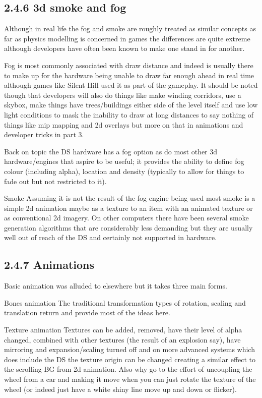 \documentclass[
]{book}
\begin{document}
\hypertarget{d-smoke-and-fog}{%
\subsection{2.4.6 3d smoke and fog}\label{d-smoke-and-fog}}

Although in real life the fog and smoke are roughly treated as similar concepts as far as physics modelling is concerned in games the differences are quite extreme although developers have often been known to make one stand in for another.

Fog is most commonly associated with draw distance and indeed is usually there to make up for the hardware being unable to draw far enough ahead in real time although games like Silent Hill used it as part of the gameplay. It should be noted though that developers will also do things like make winding corridors, use a skybox, make things have trees/buildings either side of the level itself and use low light conditions to mask the inability to draw at long distances to say nothing of things like mip mapping and 2d overlays but more on that in animations and developer tricks in part 3.

Back on topic the DS hardware has a fog option as do most other 3d hardware/engines that aspire to be useful; it provides the ability to define fog colour (including alpha), location and density (typically to allow for things to fade out but not restricted to it).

Smoke Assuming it is not the result of the fog engine being used most smoke is a simple 2d animation maybe as a texture to an item with an animated texture or as conventional 2d imagery. On other computers there have been several smoke generation algorithms that are considerably less demanding but they are usually well out of reach of the DS and certainly not supported in hardware.

\hypertarget{animations}{%
\subsection{2.4.7 Animations}\label{animations}}

Basic animation was alluded to elsewhere but it takes three main forms.

Bones animation The traditional transformation types of rotation, scaling and translation return and provide most of the ideas here.

Texture animation Textures can be added, removed, have their level of alpha changed, combined with other textures (the result of an explosion say), have mirroring and expansion/scaling turned off and on more advanced systems which does include the DS the texture origin can be changed creating a similar effect to the scrolling BG from 2d animation. Also why go to the effort of uncoupling the wheel from a car and making it move when you can just rotate the texture of the wheel (or indeed just have a white shiny line move up and down or flicker).
\end{document}
